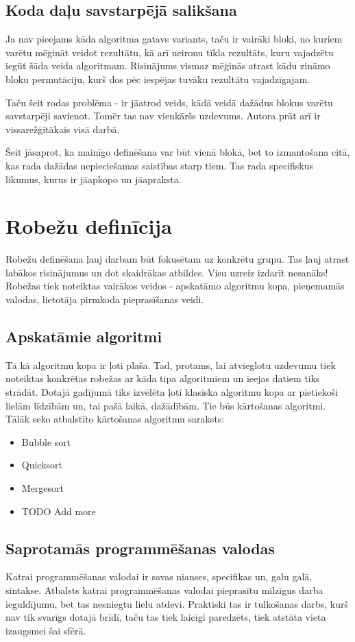 \subsection{Koda daļu savstarpējā salikšana}
Ja nav pieejams kāda algoritma gatavs variants, taču ir vairāki bloki, no kuriem varētu mēģināt veidot rezultātu, kā arī neironu tīkla rezultāts, kuru vajadzētu iegūt šāda veida algoritmam. Risinājums vismaz mēģinās atrast kādu zināmo bloku permutāciju, kurš dos pēc iespējas tuvāku rezultātu vajadzīgajam. 

Taču šeit rodas problēma - ir jāatrod veids, kādā veidā dažādus blokus varētu savstarpēji savienot. Tomēr tas nav vienkāršs uzdevums. Autora prāt arī ir vissarežģītākais visā darbā.

Šeit jāsaprot, ka mainīgo definēšana var būt vienā blokā, bet to izmantošana citā, kas rada dažādas nepieciešamas saistības starp tiem. Tas rada specifiskus likumus, kurus ir jāapkopo un jāapraksta.

\section{Robežu definīcija}
Robežu definēšana ļauj darbam būt fokusētam uz konkrētu grupu. Tas ļauj atrast labākos risinājumus un dot skaidrākas atbildes. Visu uzreiz izdarīt nesanāks! Robežas tiek noteiktas vairākos veidos - apskatāmo algoritmu kopa, pieņemamās valodas, lietotāja pirmkoda pieprasīšanas veidi.
\subsection{Apskatāmie algoritmi}
Tā kā algoritmu kopa ir ļoti plaša. Tad, protams, lai atvieglotu uzdevumu tiek noteiktas konkrētas robežas ar kāda tipa algoritmiem un ieejas datiem tiks strādāt. Dotajā gadījumā tiks izvēlēta ļoti klasiska algoritmu kopa ar pietiekoši lielām līdzībām un, tai pašā laikā, dažādībām. Tie būs kārtošanas algoritmi. Tālāk seko atbalstīto kārtošanas algoritmu saraksts:
\begin{itemize}
\item Bubble sort
\item Quicksort
\item Mergesort
\item TODO Add more
\end{itemize}
\subsection{Saprotamās programmēšanas valodas}
Katrai programmēšanas valodai ir savas nianses, specifikas un, galu galā, sintakse. Atbalsts katrai programmēšanas valodai pieprasītu milzīgus darba ieguldījumu, bet tas nesniegtu lielu atdevi. Praktiski tas ir tulkošanas darbs, kurš nav tik svarīgs dotajā brīdī, taču tas tiek laicīgi paredzēts, tiek atstāta vieta izaugsmei šai sfērā.

